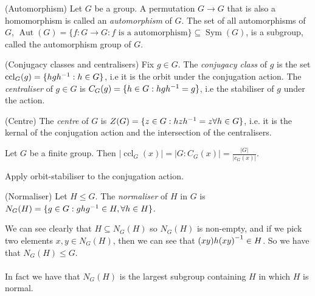 \documentclass{article}
\DeclareMathOperator{\sym}{Sym}
\DeclareMathOperator{\aut}{Aut}
\DeclareMathOperator{\ccl}{ccl}
\begin{document}
\begin{itemize}
\begin{definition}
	(Automorphism) Let $ G $ be a group. A permutation $ G\to G $ that is also a homomorphism is called an \textit{automorphism} of $ G $. The set of all automorphisms of $ G $, $ \aut(G) =\{f:G\to G: f \text{ is a automorphism}\}\subseteq \sym(G) $, is a subgroup, called the automorphism group of $ G $.
\end{definition}

\begin{definition}
	(Conjugacy classes and centralisers) Fix $ g\in G $. The \textit{conjugacy class} of $ g $ is the set $ \ccl_G(g) = \{hg\inv h: h\in G\} $, i.e it is the orbit under the conjugation action. The \textit{centraliser} of $ g\in G $ is $ C_G(g)=\{h\in G:hg{h}^{-1}=g\} $, i.e the stabiliser of $ g $ under the action.
\end{definition}
\begin{definition}
	(Centre) The \textit{centre} of $ G $ is $ Z(G)=\{z\in G:hz{h}^{-1}=z\forall h\in G\} $, i.e. it is the kernal of the conjugation action and the intersection of the centralisers.
\end{definition}
\begin{corollary}
	Let $ G $ be a finite group. Then $ |\ccl_G(x)|=|G:C_G(x)|=\frac{|G|}{|c_G(x)|} $.
\end{corollary}	
\pf Apply orbit-stabiliser to the conjugation action.
\begin{definition}
	(Normaliser) Let $ H\le G $. The \textit{normaliser} of $ H $ in $ G $ is $ N_G(H)=\{g\in G: gh{g}^{-1}\in H, \forall h\in H\} $.
\end{definition}
We can see clearly that $ H\subseteq N_G(H) $ so $ N_G(H) $ is non-empty, and if we pick two elements $ x,y\in N_G(H) $, then we can see that $ (xy)h{(xy)}^{-1}\in H $. So we have that $ N_G(H)\le G $.\\\\
In fact we have that $ N_G(H) $ is the largest subgroup containing $ H $ in which $ H $ is normal.

\end{itemize}
\end{document}
